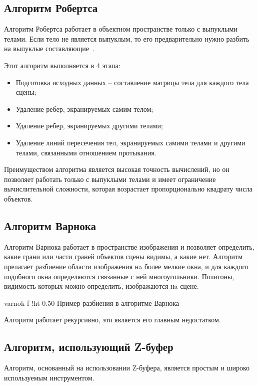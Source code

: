 \subsection{Алгоритм Робертса}

Алгоритм Робертса работает в объектном пространстве только с выпуклыми телами. 
Если тело не является выпуклым, то его предварительно нужно разбить на выпуклые составляющие~\cite{ROB}.

Этот алгоритм выполняется в 4 этапа:
\begin{itemize}[label*=---]
    \item Подготовка исходных данных – составление матрицы тела для каждого тела сцены;
    \item Удаление ребер, экранируемых самим телом;
    \item Удаление ребер, экранируемых другими телами; 
    \item Удаление линий пересечения тел, экранируемых самими телами и другими телами, связанными отношением протыкания.
\end{itemize}

Преимуществом алгоритма является высокая точность вычислений, но он позволяет работать только с выпуклыми телами и имеет ограничение вычислительной сложности, которая возрастает пропорционально квадрату числа объектов.

\subsection{Алгоритм Варнока}

Алгоритм Варнока работает в пространстве изображения и позволяет определить, какие грани или части граней объектов сцены видимы, а какие нет. 
Алгоритм прелагает разбиение области изображения нa более мелкие окна, и для каждого подобного окна определяются связанные с ней многоугольники.
Полигоны, видимость которых можно определить, изображаются нa сцене.

    {varnok}
    {f}
    {!ht}
    {0.50\textwidth}
    {Пример разбиения в алгоритме Варнока}


Алгоритм работает рекурсивно, это является его главным недостатком.


\subsection{Алгоритм, использующий Z-буфер}

Алгоритм, основанный на использовании Z-буфера, является простым и широко используемым инструментом. 


